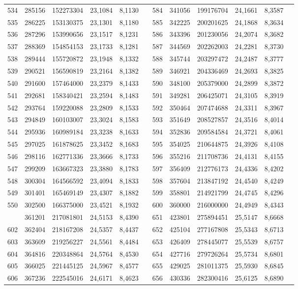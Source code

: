 \begin{longtable}{p{.17\linewidth}*{11}{S}}
534&285156&152273304&23,1084&8,1130&&584&341056&199176704&24,1661&8,3587\\
535&286225&153130375&23,1301&8,1180&&585&342225&200201625&24,1868&8,3634\\
536&287296&153990656&23,1517&8,1231&&586&343396&201230056&24,2074&8,3682\\
537&288369&154854153&23,1733&8,1281&&587&344569&202262003&24,2281&8,3730\\
538&289444&155720872&23,1948&8,1332&&588&345744&203297472&24,2487&8,3777\\
539&290521&156590819&23,2164&8,1382&&589&346921&204336469&24,2693&8,3825\\
540&291600&157464000&23,2379&8,1433&&590&348100&205379000&24,2899&8,3872\\
541&292681&158340421&23,2594&8,1483&&591&349281&206425071&24,3105&8,3919\\
542&293764&159220088&23,2809&8,1533&&592&350464&207474688&24,3311&8,3967\\
543&294849&160103007&23,3024&8,1583&&593&351649&208527857&24,3516&8,4014\\
544&295936&160989184&23,3238&8,1633&&594&352836&209584584&24,3721&8,4061\\
545&297025&161878625&23,3452&8,1683&&595&354025&210644875&24,3926&8,4108\\
546&298116&162771336&23,3666&8,1733&&596&355216&211708736&24,4131&8,4155\\
547&299209&163667323&23,3880&8,1783&&597&356409&212776173&24,4336&8,4202\\
548&300304&164566592&23,4094&8,1833&&598&357604&213847192&24,4540&8,4249\\
549&301401&165469149&23,4307&8,1882&&599&358801&214921799&24,4745&8,4296\\
550&302500&166375000&23,4521&8,1932&&600&360000&216000000&24,4949&8,4343\\
&361201&217081801&24,5153&8,4390&&651&423801&275894451&25,5147&8,6668\\
602&362404&218167208&24,5357&8,4437&&652&425104&277167808&25,5343&8,6713\\
603&363609&219256227&24,5561&8,4484&&653&426409&278445077&25,5539&8,6757\\
604&364816&220348864&24,5764&8,4530&&654&427716&279726264&25,5734&8,6801\\
605&366025&221445125&24,5967&8,4577&&655&429025&281011375&25,5930&8,6845\\
606&367236&222545016&24,6171&8,4623&&656&430336&282300416&25,6125&8,6890\\

\end{longtable}
